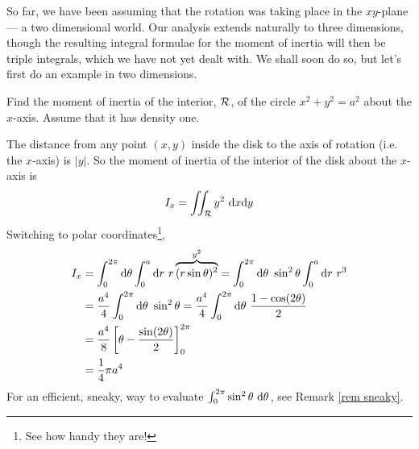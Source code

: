So far, we have been assuming that the rotation was taking place in the
$xy$-plane --- a two dimensional world. Our analysis extends naturally
to three dimensions, though the resulting integral formulae for the
moment of inertia will then be triple integrals, which we have not yet
dealt with. We shall soon do so, but let's first do an example in two
dimensions.

\begin{eg}[Disk]\label{eg moment disk}
Find the moment of inertia of the interior, $\mathcal{R}$,
of the circle $x^2+y^2=a^2$ about the $x$-axis. 
Assume that it has density one.

\soln 
The distance from any point $(x,y)$ inside the disk to the axis of
rotation (i.e. the $x$-axis) is $|y|$. 
So the moment of inertia of
the interior of the disk about the $x$-axis is
\begin{equation*}
I_x = \dblInt_\cR y^2\ \dee{x}\dee{y}
\end{equation*}
Switching to polar coordinates\footnote{See how handy they are!},
\begin{align*}
I_x &= \int_0^{2\pi}\mathrm{d}\theta\int_0^{a}\mathrm{d}r\ r
       \overbrace{(r\sin\theta)^2}^{y^2} 
= \int_0^{2\pi}\mathrm{d}\theta\ \sin^2\theta\int_0^a\mathrm{d}r\ r^3 \\
&=\frac{a^4}{4}\int_0^{2\pi}\mathrm{d}\theta\ \sin^2\theta
=\frac{a^4}{4} \int_0^{2\pi}\mathrm{d}\theta\ \frac{1-\cos(2\theta)}{2}\\
&=\frac{a^4}{8} \left[\theta-\frac{\sin(2\theta)}{2}\right]_0^{2\pi}\\
&=\frac{1}{4}\pi a^4
\end{align*}
For an efficient, sneaky, way to evaluate
$ \int_0^{2\pi} \sin^2\theta\ \mathrm{d}\theta$, see
Remark \ref{rem sneaky}.
\end{eg}

